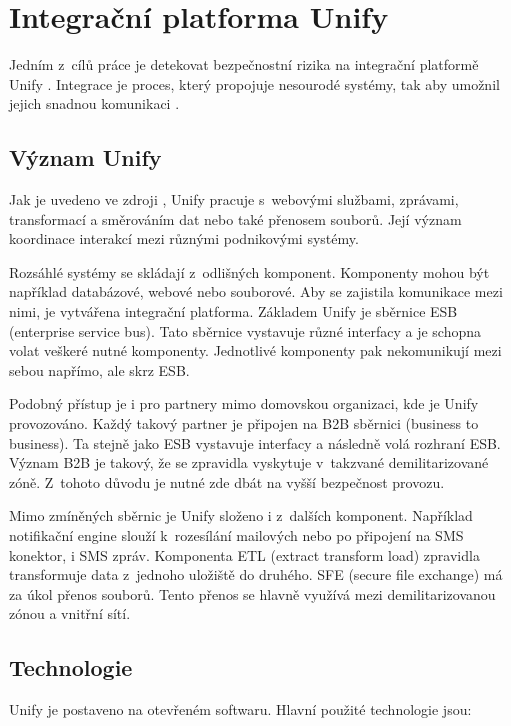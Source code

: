 \documentclass[thesis=M,czech]{FITthesis}[2012/10/20]
\begin{document}
	\section{Integrační platforma Unify}
		\label{sec:unify}
		Jedním z~cílů práce je detekovat bezpečnostní rizika na integrační platformě Unify \cite{unify}. Integrace je proces, který propojuje nesourodé systémy, tak aby umožnil jejich snadnou komunikaci \cite{integration}. 
		
		\subsection{Význam Unify}
			\label{sec:meaning-unify}
			Jak je uvedeno ve zdroji \cite{unify}, Unify pracuje s~webovými službami, zprávami, transformací a směrováním dat nebo také přenosem souborů. Její význam koordinace interakcí mezi různými podnikovými systémy.
			
			Rozsáhlé systémy se skládají z~odlišných komponent. Komponenty mohou být například databázové, webové nebo souborové. Aby se zajistila komunikace mezi nimi, je vytvářena integrační platforma. Základem Unify je sběrnice ESB (enterprise service bus). Tato sběrnice vystavuje různé interfacy a je schopna volat veškeré nutné komponenty. Jednotlivé komponenty pak nekomunikují mezi sebou napřímo, ale skrz ESB. 
			
			Podobný přístup je i pro partnery mimo domovskou organizaci, kde je Unify provozováno. Každý takový partner je připojen na B2B sběrnici (business to business). Ta stejně jako ESB vystavuje interfacy a následně volá rozhraní ESB. Význam B2B je takový, že se zpravidla vyskytuje v~takzvané demilitarizované zóně. Z~tohoto důvodu je nutné zde dbát na vyšší bezpečnost provozu.
			
			Mimo zmíněných sběrnic je Unify složeno i z~dalších komponent. Například notifikační engine slouží k~rozesílání mailových nebo po připojení na SMS konektor, i SMS zpráv. Komponenta ETL (extract transform load) zpravidla transformuje data z~jednoho uložiště do druhého. SFE (secure file exchange) má za úkol přenos souborů. Tento přenos se hlavně využívá mezi demilitarizovanou zónou a vnitřní sítí.
			
		\subsection{Technologie}
			\label{sec:unify-technologi}
			Unify je postaveno na otevřeném softwaru. Hlavní použité technologie jsou: 
			
\end{document}
